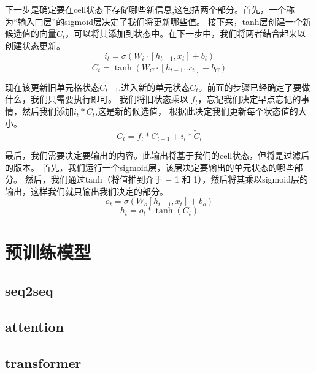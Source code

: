   下一步是确定要在cell状态下存储哪些新信息,这包括两个部分。首先，一个称为“输入门层”的sigmoid层决定了我们将更新哪些值。
  接下来，tanh层创建一个新候选值的向量$\tilde{C}_{t}$，可以将其添加到状态中。在下一步中，我们将两者结合起来以创建状态更新。
  \begin{equation}
    i_{t} =\sigma\left(W_{i} \cdot\left[h_{t-1}, x_{t}\right]+b_{i}\right) 
  \end{equation}  
    \begin{equation}
      \tilde{C}_{t} =\tanh \left(W_{C} \cdot\left[h_{t-1}, x_{t}\right]+b_{C}\right)
      \end{equation}   

现在该更新旧单元格状态$C_{t-1}$,进入新的单元状态$C_{t}$。前面的步骤已经确定了要做什么，我们只需要执行即可。
我们将旧状态乘以 $f_{t}$，忘记我们决定早点忘记的事情，然后我们添加$i_{t} * \tilde{C}_{t}$,这是新的候选值，
根据此决定我们更新每个状态值的大小。
\begin{equation}
C_{t}=f_{t} * C_{t-1}+i_{t} * \tilde{C}_{t}
\end{equation} 

最后，我们需要决定要输出的内容。此输出将基于我们的cell状态，但将是过滤后的版本。
首先，我们运行一个sigmoid层，该层决定要输出的单元状态的哪些部分。
然后，我们通过tanh（将值推到介于 − 1 和 1），然后将其乘以sigmoid层的输出，这样我们就只输出我们决定的部分。
\begin{equation}
  o_{t}=\sigma\left(W_{o}\left[h_{t-1}, x_{t}\right]+b_{o}\right)
\end{equation} 
\begin{equation}
  h_{t}=o_{t} * \tanh \left(C_{t}\right)
\end{equation}



\section{预训练模型}
\subsection{seq2seq}
\subsection{attention}
\subsection{transformer}
